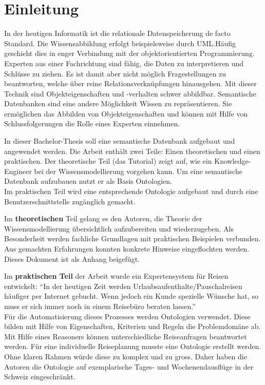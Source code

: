 \chapter{Einleitung}
\label{chap:einleitung}


In der heutigen Informatik ist die relationale Datenspeicherung de facto Standard. Die Wissensabbildung erfolgt beispielsweise durch UML.\@ Häufig geschieht dies in enger Verbindung mit der objektorientierten Programmierung. Experten aus einer Fachrichtung sind fähig, die Daten zu interpretieren und Schlüsse zu ziehen. Es ist damit aber nicht möglich Fragestellungen zu beantworten, welche über reine Relationsverknüpfungen hinausgehen. Mit dieser Technik sind Objekteigenschaften und -verhalten schwer abbildbar. Semantische Datenbanken sind eine andere Möglichkeit Wissen zu repräsentieren. Sie ermöglichen das Abbilden von Objekteigenschaften und können mit Hilfe von Schlussfolgerungen die Rolle eines Experten einnehmen.

In dieser Bachelor-Thesis soll eine semantische Datenbank aufgebaut und angewendet werden.  Die Arbeit enthält zwei Teile: Einen theoretischen und einen praktischen. Der theoretische Teil (das Tutorial) zeigt auf, wie ein Knowledge-Engineer bei der Wissensmodellierung vorgehen kann. Um eine semantische Datenbank aufzubauen nutzt er als Basis Ontologien.\\
Im praktischen Teil wird eine entsprechende Ontologie aufgebaut und durch eine Benutzerschnittstelle zugänglich gemacht.

Im \textbf{theoretischen} Teil gelang es den Autoren, die Theorie der Wissensmodellierung übersichtlich aufzubereiten und wiederzugeben. Als Besonderheit werden fachliche Grundlagen mit praktischen Beispielen verbunden. Aus gemachten Erfahrungen konnten konkrete Hinweise eingeflochten werden. Dieses Dokument ist als Anhang beigefügt.

Im \textbf{praktischen Teil} der Arbeit wurde ein Expertensystem für Reisen entwickelt: ``In der heutigen Zeit werden Urlaubsaufenthalte/Pauschalreisen häufiger per Internet gebucht. Wenn jedoch ein Kunde spezielle Wünsche hat, so muss er sich immer noch in einem Reisebüro beraten lassen.''\\
Für die Automatisierung dieses Prozesses werden Ontologien verwendet. Diese bilden mit Hilfe von Eigenschaften, Kriterien und Regeln die Problemdomäne ab. Mit Hilfe eines Reasoners können unterschiedliche Reiseanfragen beantwortet werden. Für eine individuelle Reiseplanung musste eine Ontologie erstellt werden.\\
Ohne klaren Rahmen würde diese zu komplex und zu gross. Daher haben die Autoren die Ontologie auf exemplarische Tages- und Wochenendausflüge in der Schweiz eingeschränkt.

